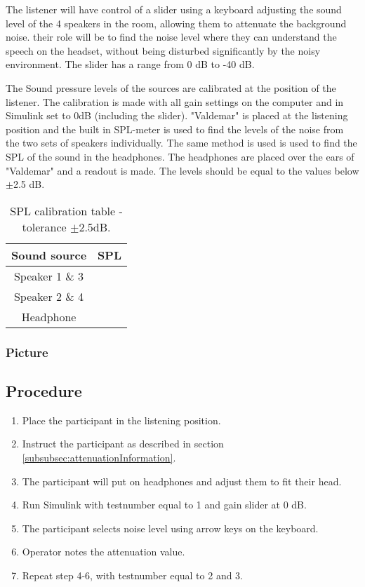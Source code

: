 The listener will have control of a slider using a keyboard adjusting the sound level of the 4 speakers in the room, allowing them to attenuate the background noise. their role will be to find the noise level where they can understand the speech on the headset, without being disturbed significantly by the noisy environment. The slider has a range from 0 dB to -40 dB. 

The Sound pressure levels of the sources are calibrated at the position of the listener. The calibration is made with all gain settings on the computer and in Simulink set to 0dB (including the slider). "Valdemar" is placed at the listening position and the built in SPL-meter is used to find the levels of the noise from the two sets of speakers individually. 
The same method is used is used to find the SPL of the sound in the headphones. The headphones are placed over the ears of "Valdemar" and a readout is made. The levels should be equal to the values below $\pm$2.5 dB. \\
\begin{table} [H]
\centering
	\begin{tabular}{c c}			\toprule
		Sound source	& SPL	\\ 	\bottomrule
		Speaker 1 \& 3	&		\\
		Speaker 2 \& 4	&		\\
		Headphone		&		\\ \bottomrule
	\end{tabular}
	\caption{SPL calibration table - tolerance $\pm$2.5dB.}
	\label{tab:SPLCalibration}
\end{table}   

\subsubsection{Picture}

\subsection{Procedure}

\begin{enumerate}
	\item Place the participant in the listening position.
	\item Instruct the participant as described in section \ref{subsubsec:attenuationInformation}.
	\item The participant will put on headphones and adjust them to fit their head.
	\item Run Simulink  with testnumber equal to 1 and gain slider at 0 dB.
	\item The participant selects noise level using arrow keys on the keyboard.
	\item Operator notes the attenuation value.
	\item Repeat step 4-6, with testnumber equal to 2 and 3.
\end{enumerate}


